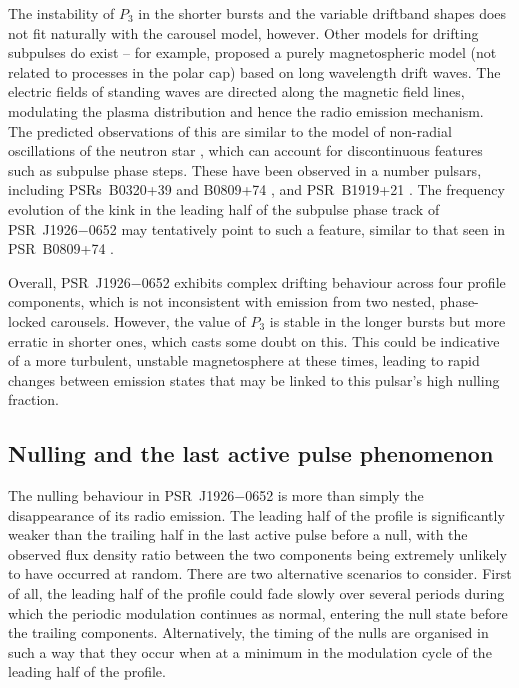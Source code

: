 The instability of $P_3$ in the shorter bursts and the variable driftband shapes does not fit naturally with the carousel model, however. Other models for drifting subpulses do exist -- for example, \citet{GMML2005} proposed a purely magnetospheric model (not related to processes in the polar cap) based on long wavelength drift waves. The electric fields of standing waves are directed along the magnetic field lines, modulating the plasma distribution and hence the radio emission mechanism. The predicted observations of this are similar to the model of non-radial oscillations of the neutron star \citep[e.g.][]{DCxx1968, CRxx2004}, which can account for discontinuous features such as subpulse phase steps. These have been observed in a number pulsars, including PSRs~B0320+39 and B0809+74 \citep{ESLx2003,ESxx2003b}, and PSR~B1919+21 \citep{PWxx1986,WSEx2007}. The frequency evolution of the kink in the leading half of the subpulse phase track of PSR~J1926$-$0652 may tentatively point to such a feature, similar to that seen in PSR~B0809+74 \citep{HSW+2013}.

Overall, PSR~J1926$-$0652 exhibits complex drifting behaviour across four profile components, which is not inconsistent with emission from two nested, phase-locked carousels.  However, the value of $P_3$ is stable in the longer bursts but more erratic in shorter ones, which casts some doubt on this. This could be indicative of a more turbulent, unstable magnetosphere at these times, leading to rapid changes between emission states that may be linked to this pulsar's high nulling fraction.



\subsection{Nulling and the last active pulse phenomenon}
\label{sec: J1926 - discuss - LAP}

The nulling behaviour in PSR~J1926$-$0652 is more than simply the disappearance of its radio emission. The leading half of the profile is significantly weaker than the trailing half in the last active pulse before a null, with the observed flux density ratio between the two components being extremely unlikely to have occurred at random. 
There are two alternative scenarios to consider. First of all, the leading half of the profile could fade slowly over several periods during which the periodic modulation continues as normal, entering the null state before the trailing components. Alternatively, the timing of the nulls are organised in such a way that they occur when at a minimum in the modulation cycle of the leading half of the profile.

